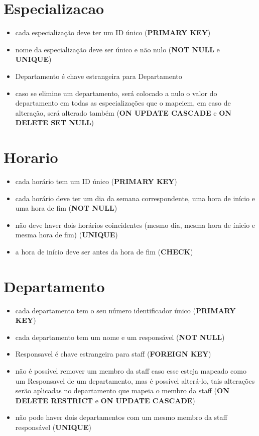 \documentclass[article, a4paper, 12pt, oneside]{memoir}
\begin{document}
\section*{Especializacao}
\begin{itemize}
	\item cada especialização deve ter um ID único (\textbf{PRIMARY KEY})
	\item nome da especialização deve ser único e não nulo (\textbf{NOT NULL} e \textbf{UNIQUE})
	\item Departamento é chave estrangeira para Departamento
	\item caso se elimine um departamento, será colocado a nulo o valor do departamento em todas as especializações que o mapeiem, em caso de alteração, será alterado também (\textbf{ON UPDATE CASCADE} e \textbf{ON DELETE SET NULL})
\end{itemize}

\newpage

\section*{Horario}
\begin{itemize}
	\item cada horário tem um ID único (\textbf{PRIMARY KEY})
	\item cada horário deve ter um dia da semana correspondente, uma hora de início e uma hora de fim (\textbf{NOT NULL})
	\item não deve haver dois horários coincidentes (mesmo dia, mesma hora de ínicio e mesma hora de fim) (\textbf{UNIQUE})
	\item a hora de início deve ser antes da hora de fim (\textbf{CHECK})
\end{itemize}

\section*{Departamento}
\begin{itemize}
	\item cada departamento tem o seu número identificador único (\textbf{PRIMARY KEY})
	\item cada departamento tem um nome e um responsável (\textbf{NOT NULL})
	\item Responsavel é chave estrangeira para staff (\textbf{FOREIGN KEY})
	\item não é possível remover um membro da staff caso esse esteja mapeado como um Responsavel de um departamento, mas é possível alterá-lo, tais alterações serão aplicadas no departamento que mapeia o membro da staff (\textbf{ON DELETE RESTRICT} e \textbf{ON UPDATE CASCADE})
	\item não pode haver dois departamentos com um mesmo membro da staff responsável (\textbf{UNIQUE})
\end{itemize}
\end{document}
